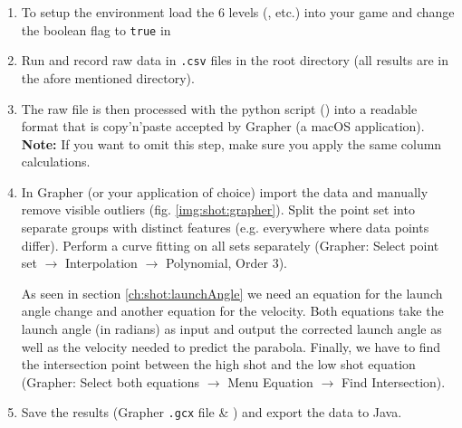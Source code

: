 \begin{enumerate}
	\item To setup the environment load the \num{6} levels (, etc.) into your game and change the boolean flag to \texttt{true} in 

	\item Run  and record raw data in \texttt{.csv} files in the root directory (all results are in the afore mentioned  directory).

	\item The raw file is then processed with the python script () into a readable format that is copy'n'paste accepted by Grapher (a macOS application).\\
	\textbf{Note:} If you want to omit this step, make sure you apply the same column calculations.

	\item In Grapher (or your application of choice) import the data and manually remove visible outliers (fig. \ref{img:shot:grapher}). Split the point set into separate groups with distinct features (e.g. everywhere where data points differ). Perform a curve fitting on all sets separately (Grapher: Select point set $\rightarrow$ Interpolation $\rightarrow$ Polynomial, Order 3).
	
	As seen in section \ref{ch:shot:launchAngle} we need an equation for the launch angle change and another equation for the velocity. Both equations take the launch angle (in radians) as input and output the corrected launch angle as well as the velocity needed to predict the parabola. Finally, we have to find the intersection point between the high shot and the low shot equation (Grapher: Select both equations $\rightarrow$ Menu Equation $\rightarrow$ Find Intersection).
	
	\item Save the results (Grapher \texttt{.gcx} file \& ) and export the data to Java.
\end{enumerate}


